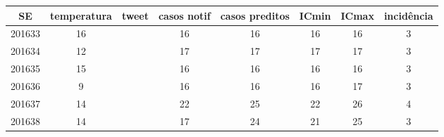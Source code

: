 \begin{tabular}{c|ccccccc}
  \hline
SE & temperatura & tweet & casos notif & casos preditos & ICmin & ICmax & incidência \\ 
  \hline
201633 & 16 &  & 16 & 16 & 16 & 16 & 3 \\ 
  201634 & 12 &  & 17 & 17 & 17 & 17 & 3 \\ 
  201635 & 15 &  & 16 & 16 & 16 & 16 & 3 \\ 
  201636 & 9 &  & 16 & 16 & 16 & 17 & 3 \\ 
  201637 & 14 &  & 22 & 25 & 22 & 26 & 4 \\ 
  201638 & 14 &  & 17 & 24 & 21 & 25 & 3 \\ 
   \hline
\end{tabular}
